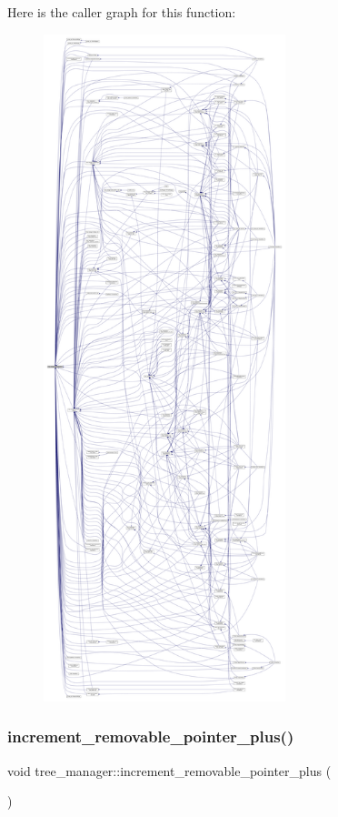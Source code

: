 Here is the caller graph for this function\+:
\nopagebreak
\begin{figure}[H]
\begin{center}
\leavevmode
\includegraphics[height=550pt]{d2/ddd/classtree__manager_ab73b98908338fff37cdc84891befd090_icgraph}
\end{center}
\end{figure}
\mbox{\label{classtree__manager_a8aed89986e2d2d949dfdddea890d4c35}} 
\subsubsection{\texorpdfstring{increment\+\_\+removable\+\_\+pointer\+\_\+plus()}{increment\_removable\_pointer\_plus()}}
{\footnotesize\ttfamily void tree\+\_\+manager\+::increment\+\_\+removable\+\_\+pointer\+\_\+plus (\begin{DoxyParamCaption}{ }\end{DoxyParamCaption})}




